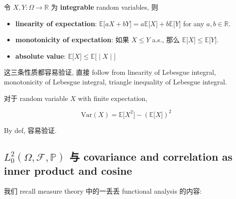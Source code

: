 \begin{proposition}{}

令 \(\mathit{X},\mathit{Y}:\Omega\rightarrow\mathbb{R}\) 为 \textbf{integrable} random variables, 则

\begin{itemize}
\item
  \textbf{linearity of expectation}: \(\mathbb{E}\lbrack\mathit{a}\mathit{X} + \mathit{b}\mathit{Y}\rbrack = \mathit{a}\mathbb{E}\lbrack\mathit{X}\rbrack + \mathit{b}\mathbb{E}\lbrack\mathit{Y}\rbrack\) for any \(\mathit{a},\mathit{b} \in \mathbb{R}\).
\item
  \textbf{monotonicity of expectation}: 如果 \(\mathit{X} \leq \mathit{Y}\) a.s., 那么 \(\mathbb{E}\lbrack\mathit{X}\rbrack \leq \mathbb{E}\lbrack\mathit{Y}\rbrack\).
\item
  \textbf{absolute value}: \(\left. \mathbb{E}\lbrack\mathit{X}\rbrack \leq \mathbb{E}\lbrack \middle| \mathit{X} \middle| \rbrack \right.\)
\end{itemize}

\end{proposition}

这三条性质都容易验证, 直接 follow from linearity of Lebesgue integral, monotonicity of Lebesgue integral, triangle inequality of Lebesgue integral.

\begin{proposition}{}

对于 random variable \(\mathit{X}\) with finite expectation,

\[\text{Var}(\mathit{X}) = \mathbb{E}\lbrack\mathit{X}^{2}\rbrack - (\mathbb{E}\lbrack\mathit{X}\rbrack)^{2}\]

\end{proposition}

By def, 容易验证.

\subsection{\texorpdfstring{\(\mathit{L}_{0}^{2}(\Omega,\mathcal{F},\mathbb{P})\) 与 covariance and correlation as inner product and cosine}{\textbackslash mathit\{L\}\_\{0\}\^{}\{2\}(\textbackslash Omega,\textbackslash mathcal\{F\},\textbackslash mathbb\{P\}) 与 covariance and correlation as inner product and cosine}}\label{mathitl_02omegamathcalfmathbbp-ux4e0e-covariance-and-correlation-as-inner-product-and-cosine}

我们 recall measure theory 中的一丢丢 functional analysis 的内容:

